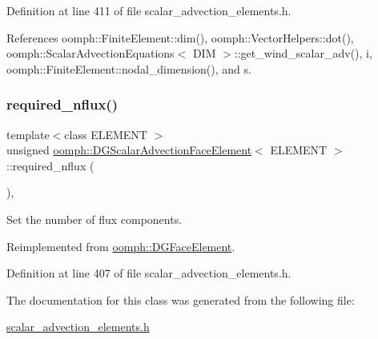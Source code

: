 Definition at line 411 of file scalar\+\_\+advection\+\_\+elements.\+h.



References oomph\+::\+Finite\+Element\+::dim(), oomph\+::\+Vector\+Helpers\+::dot(), oomph\+::\+Scalar\+Advection\+Equations$<$ D\+I\+M $>$\+::get\+\_\+wind\+\_\+scalar\+\_\+adv(), i, oomph\+::\+Finite\+Element\+::nodal\+\_\+dimension(), and s.

\mbox{\label{classoomph_1_1DGScalarAdvectionFaceElement_ae3c10d2af6a6aae42ced528040a4d530}} 
\subsubsection{\texorpdfstring{required\+\_\+nflux()}{required\_nflux()}}
{\footnotesize\ttfamily template$<$class E\+L\+E\+M\+E\+NT $>$ \\
unsigned \hyperlink{classoomph_1_1DGScalarAdvectionFaceElement}{oomph\+::\+D\+G\+Scalar\+Advection\+Face\+Element}$<$ E\+L\+E\+M\+E\+NT $>$\+::required\+\_\+nflux (\begin{DoxyParamCaption}{ }\end{DoxyParamCaption})\hspace{0.3cm}{\ttfamily [inline]}, {\ttfamily [virtual]}}



Set the number of flux components. 



Reimplemented from \hyperlink{classoomph_1_1DGFaceElement_af45b5a88226a143c8fafbc5f3e097526}{oomph\+::\+D\+G\+Face\+Element}.



Definition at line 407 of file scalar\+\_\+advection\+\_\+elements.\+h.



The documentation for this class was generated from the following file\+:\begin{DoxyCompactItemize}
\item 
\hyperlink{scalar__advection__elements_8h}{scalar\+\_\+advection\+\_\+elements.\+h}\end{DoxyCompactItemize}
